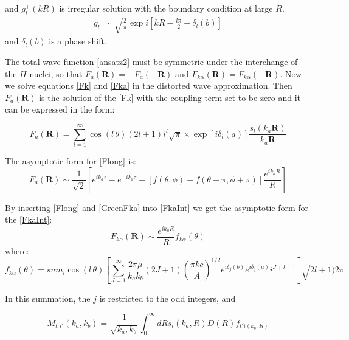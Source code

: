 and $ g^{+}_l(kR) $ is irregular solution with the boundary condition at large $ R $.
\begin{equation}
\begin{split}
g^{+}_{l} \sim \sqrt{\frac{2}{\pi}}\exp i\left[kR - \frac{l\pi}{2} + \delta_l(b)\right]
\end{split}
\end{equation}
and $  \delta_l(b) $ is a phase shift. 

The total wave function \eqref{ansatz2} must be symmetric under the interchange of the $ H $ nuclei, so that $ F_a(\mathbf{R}) = -F_a(-\mathbf{R}) $ and $ F_{k\alpha}(\mathbf{R}) =  F_{k\alpha}(-\mathbf{R}) $. Now we solve equations \eqref{Fk} and \eqref{Fka} in the distorted wave approximation. Then $ F_a(\mathbf{R}) $ is the solution of the \eqref{Fk} with the coupling term set to be zero and it can be expressed in the form:


\begin{equation}\label{Flong}
F_a(\mathbf{R}) = \sum_{l=1}^{\infty}{\cos(l\,\theta)(2l+1)i^{l}\sqrt{\pi}\times \exp[i\delta_l(a)]\frac{s_l(k_a\mathbf{R})}{k_a\mathbf{R} } } 
\end{equation}

The asymptotic form for \eqref{Flong} is:
\begin{equation}\label{FlongA}
F_a(\mathbf{R}) \sim \frac{1}{\sqrt{2}}\left[e^{ik_az}-e^{-ik_az} + [f(\theta,\phi) - f(\theta-\pi,\phi+\pi)]\frac{e^{ik_aR}}{R}\right]
\end{equation}

By inserting \eqref{Flong} and \eqref{GreenFka} into \eqref{FkaInt} we get the asymptotic form for the  \eqref{FkaInt}:
\begin{equation}\label{FlongAA}
F_{k\alpha}(\mathbf{R}) \sim \frac{e^{ik_aR}}{R}f_{k\alpha}(\theta)
\end{equation}
where:
\begin{equation}\label{fkaa}
f_{k\alpha}(\theta) = sum_{l}{\cos(l\,\theta)\left[\sum_{J=1}^{\infty}{\frac{2\pi\mu}{k_ak_b}(2J+1)\left(\frac{\pi k c}{A}\right)^{1/2}e^{i\delta_j(b)}e^{i\delta_j(a)}i^{J+l-1} }\right]\sqrt{2l+1)2\pi}}
\end{equation}

In this summation, the $ j $ is restricted to the odd integers, and 

\begin{equation}\label{Mll}
M_{l,l'}(k_a,k_b) = \frac{1}{\sqrt{k_a,k_b}}\int_0^{\infty}{dRs_l(k_a,R)D(R)f_{l')(k_b,R)} }
\end{equation}

